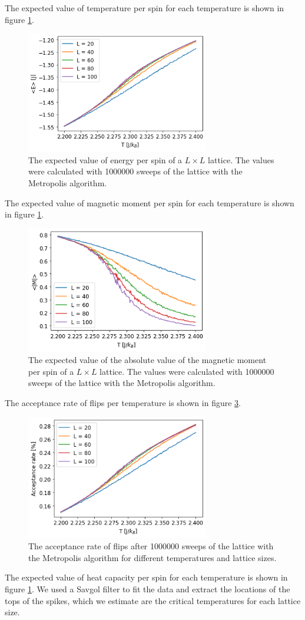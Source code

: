 \documentclass[reprint,english,notitlepage]{revtex4-1}
\begin{document}
	The expected value of temperature per spin for each temperature is shown in figure \ref{fig:E}. 
	\begin{figure}[H]
		\includegraphics[width=80mm]{../../Code/Figures/E.png}
		\caption{The expected value of energy per spin of a $L \times L$ lattice. The values were calculated with 1000000 sweeps of the lattice with the Metropolis algorithm.}
		\label{fig:E}
	\end{figure}
	The expected value of magnetic moment per spin for each temperature is shown in figure \ref{fig:E}. 
	\begin{figure}[H]
		\includegraphics[width=80mm]{../../Code/Figures/M.png}
		\caption{The expected value of the absolute value of the magnetic moment per spin of a $L \times L$ lattice. The values were calculated with 1000000 sweeps of the lattice with the Metropolis algorithm.}
		\label{fig:M}
	\end{figure}
	The acceptance rate of flips per temperature is shown in figure \ref{fig:A}.
	\begin{figure}[H]
		\includegraphics[width=80mm]{../../Code/Figures/A.png}
		\caption{The acceptance rate of flips after 1000000 sweeps of the lattice with the Metropolis algorithm for different temperatures and lattice sizes.}
		\label{fig:A}
	\end{figure}
	The expected value of heat capacity per spin for each temperature is shown in figure \ref{fig:E}. We used a Savgol filter to fit the data and extract the locations of the tops of the spikes, which we estimate are the critical temperatures for each lattice size.
	
\end{document}
